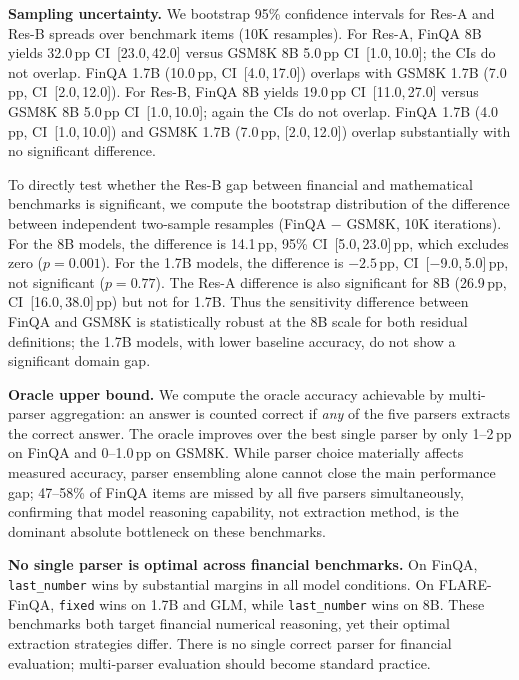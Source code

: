\textbf{Sampling uncertainty.} We bootstrap 95\% confidence intervals for Res-A and Res-B spreads over benchmark items (10K resamples). For Res-A, FinQA 8B yields 32.0\,pp CI~[23.0,\,42.0] versus GSM8K 8B 5.0\,pp CI~[1.0,\,10.0]; the CIs do not overlap. FinQA 1.7B (10.0\,pp, CI~[4.0,\,17.0]) overlaps with GSM8K 1.7B (7.0\,pp, CI~[2.0,\,12.0]). For Res-B, FinQA 8B yields 19.0\,pp CI~[11.0,\,27.0] versus GSM8K 8B 5.0\,pp CI~[1.0,\,10.0]; again the CIs do not overlap. FinQA 1.7B (4.0\,pp, CI~[1.0,\,10.0]) and GSM8K 1.7B (7.0\,pp, [2.0,\,12.0]) overlap substantially with no significant difference.

To directly test whether the Res-B gap between financial and mathematical benchmarks is significant, we compute the bootstrap distribution of the difference between independent two-sample resamples (FinQA $-$ GSM8K, 10K iterations). For the 8B models, the difference is 14.1\,pp, 95\% CI~[5.0,\,23.0]\,pp, which excludes zero ($p = 0.001$). For the 1.7B models, the difference is $-2.5$\,pp, CI~[$-$9.0,\,5.0]\,pp, not significant ($p = 0.77$). The Res-A difference is also significant for 8B (26.9\,pp, CI~[16.0,\,38.0]\,pp) but not for 1.7B. Thus the sensitivity difference between FinQA and GSM8K is statistically robust at the 8B scale for both residual definitions; the 1.7B models, with lower baseline accuracy, do not show a significant domain gap.

\textbf{Oracle upper bound.} We compute the oracle accuracy achievable by multi-parser aggregation: an answer is counted correct if \emph{any} of the five parsers extracts the correct answer. The oracle improves over the best single parser by only 1--2\,pp on FinQA and 0--1.0\,pp on GSM8K. While parser choice materially affects measured accuracy, parser ensembling alone cannot close the main performance gap; 47--58\% of FinQA items are missed by all five parsers simultaneously, confirming that model reasoning capability, not extraction method, is the dominant absolute bottleneck on these benchmarks.

\textbf{No single parser is optimal across financial benchmarks.} On FinQA, \texttt{last\_number} wins by substantial margins in all model conditions. On FLARE-FinQA, \texttt{fixed} wins on 1.7B and GLM, while \texttt{last\_number} wins on 8B. These benchmarks both target financial numerical reasoning, yet their optimal extraction strategies differ. There is no single correct parser for financial evaluation; multi-parser evaluation should become standard practice.

